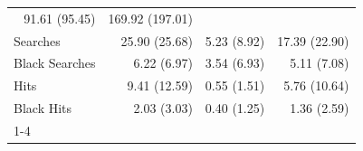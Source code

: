\begin{table}[!h]
\begin{tabular}{llll}
  \multicolumn{1}{r}{91.61 (95.45)} &
  \multicolumn{1}{r}{169.92 (197.01)} \\
\multicolumn{1}{l}{\hspace{1em}Searches} &
  \multicolumn{1}{r}{25.90 (25.68)} &
  \multicolumn{1}{r}{5.23 (8.92)} &
  \multicolumn{1}{r}{17.39 (22.90)} \\
\multicolumn{1}{l}{\hspace{1em}Black Searches} &
  \multicolumn{1}{r}{6.22 (6.97)} &
  \multicolumn{1}{r}{3.54 (6.93)} &
  \multicolumn{1}{r}{5.11 (7.08)} \\
\multicolumn{1}{l}{\hspace{1em}Hits} &
  \multicolumn{1}{r}{9.41 (12.59)} &
  \multicolumn{1}{r}{0.55 (1.51)} &
  \multicolumn{1}{r}{5.76 (10.64)} \\
\multicolumn{1}{l}{\hspace{1em}Black Hits} &
  \multicolumn{1}{r}{2.03 (3.03)} &
  \multicolumn{1}{r}{0.40 (1.25)} &
  \multicolumn{1}{r}{1.36 (2.59)} \\
\cline{1-4}
\end{tabular}
\end{table}
